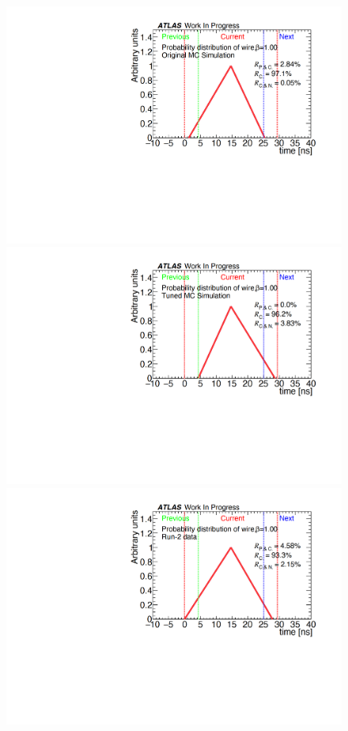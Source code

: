 \begin{figure}[tbp]
    \begin{minipage}{0.33\hsize}
    \centering   
    \includegraphics[width=\textwidth,page=1]{img/rec/rec_ori_w.pdf}
    \subcaption{}
    \end{minipage}
    \begin{minipage}{0.33\hsize}
    \centering   
    \includegraphics[width=\textwidth,page=1]{img/rec/rec_tune_w.pdf}
    \subcaption{}
    \end{minipage}
    \begin{minipage}{0.33\hsize}
    \centering   
    \includegraphics[width=\textwidth,page=1]{img/rec/rec_data_w.pdf}

\end{minipage}
\end{figure}
